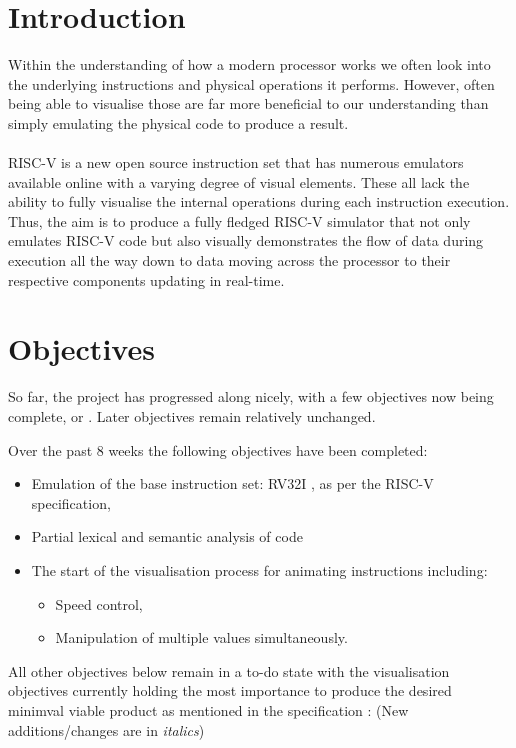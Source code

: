\documentclass[a4paper,fleqn,twoside,12pt]{article}
\begin{document}


\pagestyle{plain}

\section{Introduction}
Within the understanding of how a modern processor works we often look into the underlying instructions and physical operations it performs. However, often being able to visualise
those are far more beneficial to our understanding than simply emulating the physical code to produce a result.
\\\\
RISC-V is a new open source instruction set that has numerous emulators available online with a varying degree of visual elements.
These all lack the ability to fully visualise the internal operations during each instruction execution. Thus, the aim is to produce a fully fledged RISC-V simulator that not only emulates RISC-V code but also visually demonstrates the flow of data during execution all the way down to data moving across the processor to their respective components updating in real-time.
\section{Objectives}
So far, the project has progressed along nicely, with a few objectives now being complete, or . Later objectives remain relatively unchanged.

Over the past 8 weeks the following objectives have been completed:
\begin{itemize}
    \item Emulation of the base instruction set: RV32I \cite{risc_spec}, as per the RISC-V specification,
    \item Partial lexical and semantic analysis of code
    \item The start of the visualisation process for animating instructions including:
        \begin{itemize}
            \item Speed control,
            \item Manipulation of multiple values simultaneously.
        \end{itemize}
\end{itemize}

All other objectives below remain in a to-do state with the visualisation objectives currently holding the most importance to produce the desired minimval viable product as mentioned in the specification \cite{hollowell_2022_visual}: (New additions/changes are in \textit{italics})
\end{document}
